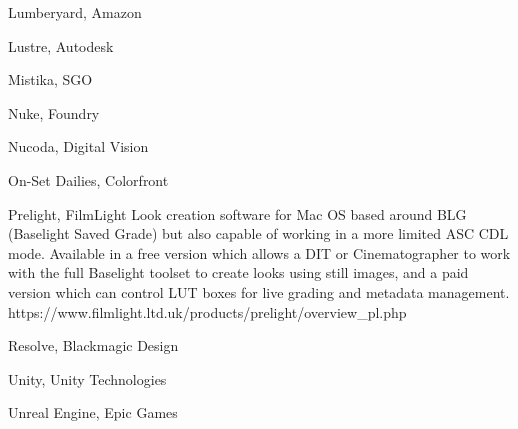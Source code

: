 Lumberyard, Amazon

Lustre, Autodesk

Mistika, SGO

Nuke, Foundry

Nucoda, Digital Vision

On-Set Dailies, Colorfront

Prelight, FilmLight
Look creation software for Mac OS based around BLG (Baselight Saved Grade) but also capable of working in a more limited ASC CDL mode. Available in a free version which allows a DIT or Cinematographer to work with the full Baselight toolset to create looks using still images, and a paid version which can control LUT boxes for live grading and metadata management. https://www.filmlight.ltd.uk/products/prelight/overview_pl.php

Resolve, Blackmagic Design

Unity, Unity Technologies

Unreal Engine, Epic Games

